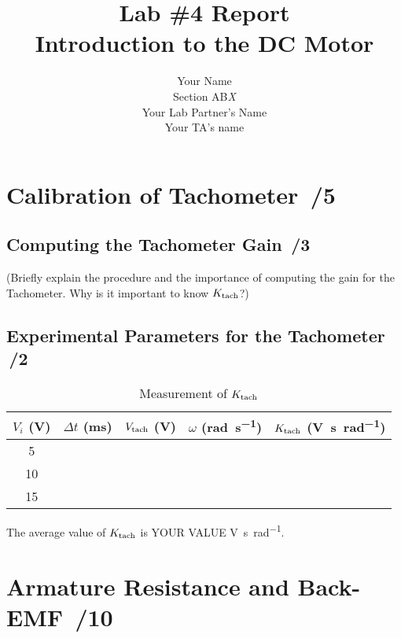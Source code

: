 \documentclass{article}
\newcommand{\score}{\hfill \underline{\hspace{0.65cm}}\,/} %
\begin{document}
\title{\bf Lab \#4 Report\\{\sc Introduction to the DC Motor}}
\author{Your Name\\ Section AB\emph{X}\\
Your Lab Partner's Name\\
Your TA's name}
\maketitle
\section{Calibration of Tachometer \score 5}
\subsection{Computing the Tachometer Gain \score 3}
(Briefly explain the procedure and the importance of computing the gain for the Tachometer. Why is it important to know $K_{\rm tach}$?)

\subsection{Experimental Parameters for the Tachometer \score 2}
\begin{table}[phtb] \label{tbl:lab4_q1}
\begin{center}
\caption{Measurement of $K_{\rm tach}$}
\begin{tabular}{c|r|r|r|r} \hline \hline 
\cellcolor{lightgray} $V_i$ (\si{\volt}) & \cellcolor{lightgray} $\Delta t$ (\si{\milli\second}) & \cellcolor{lightgray} $V_{\rm tach}$ (\si{V}) & \cellcolor{lightgray} $\omega$ (\si{\radian\per\second}) & \cellcolor{lightgray} $K_{\rm tach}$ (\si{\volt\second\per\radian}) \\
\hline
5  &  &  &  &  \\ \hline
10 &  &  &  &  \\ \hline
15 &  &  &  &  \\ \hline
\end{tabular}
\end{center}
\end{table}

The average value of $K_{\rm tach}$ is YOUR VALUE \si{\volt\second\per\radian}.

\section{Armature Resistance and Back-EMF \score 10}
\end{document}
